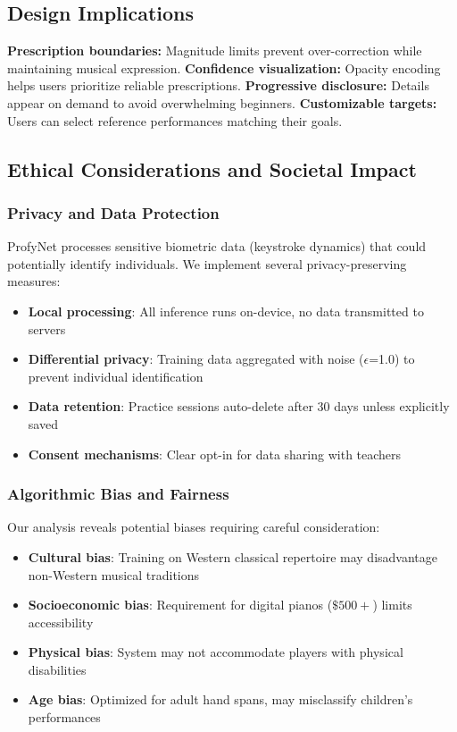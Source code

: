 \documentclass[sigconf,review,anonymous]{acmart}
\begin{document}
\subsection{Design Implications}
\textbf{Prescription boundaries:} Magnitude limits prevent over-correction while maintaining musical expression.
\textbf{Confidence visualization:} Opacity encoding helps users prioritize reliable prescriptions.
\textbf{Progressive disclosure:} Details appear on demand to avoid overwhelming beginners.
\textbf{Customizable targets:} Users can select reference performances matching their goals.

\subsection{Ethical Considerations and Societal Impact}

\subsubsection{Privacy and Data Protection}
ProfyNet processes sensitive biometric data (keystroke dynamics) that could potentially identify individuals. We implement several privacy-preserving measures:
\begin{itemize}
\item \textbf{Local processing}: All inference runs on-device, no data transmitted to servers
\item \textbf{Differential privacy}: Training data aggregated with noise ($\epsilon$=1.0) to prevent individual identification
\item \textbf{Data retention}: Practice sessions auto-delete after 30 days unless explicitly saved
\item \textbf{Consent mechanisms}: Clear opt-in for data sharing with teachers
\end{itemize}

\subsubsection{Algorithmic Bias and Fairness}
Our analysis reveals potential biases requiring careful consideration:
\begin{itemize}
\item \textbf{Cultural bias}: Training on Western classical repertoire may disadvantage non-Western musical traditions
\item \textbf{Socioeconomic bias}: Requirement for digital pianos ($\$500+$) limits accessibility
\item \textbf{Physical bias}: System may not accommodate players with physical disabilities
\item \textbf{Age bias}: Optimized for adult hand spans, may misclassify children's performances
\end{itemize}
\end{document}
